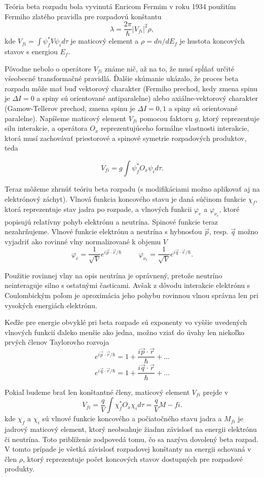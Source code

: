 \documentclass[../../main.tex]{subfiles}
\begin{document}
Teória beta rozpadu bola vyvinutá Enricom Fermim v roku 1934 použitím Fermiho zlatého pravidla pre rozpadovú konštantu
$$ \lambda = \frac{2\pi}{\hbar}\vert V_{fi} \vert^2 \rho, $$
kde $V_{fi} = \int \psi^{*}_f V \psi_i d\tau$ je maticový element a $\rho = dn/dE_f$ je hustota koncových stavov s energiou $E_f$.

Pôvodne nebolo o operátore $V_{fi}$ známe nič, až na to, že musí spĺňať určité všeobecné transformačné pravidlá. Ďalšie skúmanie ukázalo, že proces beta rozpadu môže mať buď vektorový charakter (Fermiho prechod, kedy zmena spinu je $\Delta I = 0$ a spiny sú orientované antiparalelne) alebo axiálne-vektorový charakter (Gamow-Tellerov prechod, zmena spinu je $\Delta I = 0,1$ a spiny sú orientované paralelne). Napíšeme maticový element $V_{fi}$ pomocou faktoru $g$, ktorý reprezentuje silu interakcie, a operátora $O_x$ reprezentujúceho formálne vlastnosti interakcie, ktorá musí zachovávať priestorové a spinové symetrie rozpadových produktov, teda

$$ V_{fi} = g \int \psi^{*}_f O_x \psi_i d\tau. $$

Teraz môžeme zhrnúť teóriu beta rozpadu (s modifikáciami možno aplikovať aj na elektrónový záchyt). Vlnová funkcia koncového stavu je daná súčinom funkcie $\chi_f$, ktorá reprezentuje stav jadra po rozpade, a vlnových funkcii $\varphi_e$ a $\varphi_{\nu_e}$, ktoré popisujú relatívny pohyb elektrónu a neutrína. Spinové funkcie teraz nezahrňujeme. Vlnové funkcie elektrónu a neutrína s hybnosťou $\vec{p}$, resp. $\vec{q}$ možno vyjadriť ako rovinné vlny normalizované k objemu $V$
$$ \varphi_e = \frac{1}{\sqrt{V}}e^{i\vec{p}\cdot \vec{r}/\hbar}  \hspace{1cm}  \varphi_{\nu_e} = \frac{1}{\sqrt{V}}e^{i\vec{q}\cdot \vec{r}/\hbar}. $$

Použitie rovinnej vlny na opis neutrína je oprávnený, pretože neutríno neinteraguje silno s ostatnými časticami. Avšak z dôvodu interakcie elektrónu s Coulombickým poľom je aproximácia jeho pohybu rovinnou vlnou správna len pri vysokých energiách elektrónu.

Keďže pre energie obvyklé pri beta rozpade sú exponenty vo vyššie uvedených vlnových funkcií ďaleko menšie ako jedna, možno vziať do úvahy len niekoľko prvých členov Taylorovho rozvoja
$$ e^{i\vec{p}\cdot \vec{r}/\hbar} = 1+ \frac{i\vec{p}\cdot\vec{r}}{\hbar} +...$$
$$ e^{i\vec{q}\cdot \vec{r}/\hbar} = 1+ \frac{i\vec{q}\cdot\vec{r}}{\hbar} +...$$

Pokiaľ budeme brať len konštantné členy, maticový element $V_{fi}$ prejde v
$$ V_{fi}=\frac{q}{V} \int \chi_f^{*}O_x\chi_i d\tau = \frac{q}{V}M-{fi}. $$
kde $\chi_f$ a $\chi_i$ sú vlnové funkcie koncového a počiatočného stavu jadra a $M_{fi}$ je jadrový maticový element, ktorý neobsahuje žiadnu závislosť na energii elektrónu či neutrína. Toto priblíženie zodpovedá tomu, čo sa nazýva dovolený beta rozpad. V tomto prípade je všetká závislosť rozpadovej konštanty na energii schovaná v člen $\rho$, ktorý reprezentuje počet koncových stavov dostupných pre rozpadové produkty.
\end{document}
